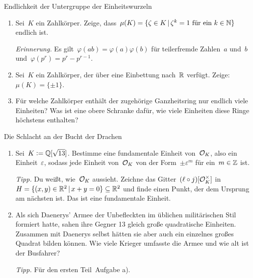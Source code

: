 \documentclass{uebblatt}
\begin{document}

\begin{aufgabe}{Endlichkeit der Untergruppe der Einheitswurzeln}
\begin{enumerate}
\item Sei~$K$ ein Zahlkörper. Zeige, dass~$\mu(K) = \{ \zeta \in K \,|\,
\text{$\zeta^k = 1$ für ein~$k \in \mathbb{N}$} \}$ endlich ist.

{\tiny\emph{Erinnerung.} Es gilt~$\varphi(ab) = \varphi(a) \varphi(b)$ für
teilerfremde Zahlen~$a$ und~$b$ und~$\varphi(p^r) = p^r - p^{r-1}$.\par}

\item Sei~$K$ ein Zahlkörper, der über eine Einbettung nach~$\mathbb{R}$ verfügt.
Zeige: $\mu(K) = \{ \pm1 \}$.

\item Für welche Zahlkörper enthält der zugehörige Ganzheitsring nur endlich
viele Einheiten? Was ist eine obere Schranke dafür, wie viele Einheiten diese
Ringe höchstens enthalten?
\end{enumerate}
\end{aufgabe}

\begin{aufgabe}{Die Schlacht an der Bucht der Drachen}
\begin{enumerate}
\item Sei~$K \vcentcolon= \mathbb{Q}[\sqrt{13}]$. Bestimme eine fundamentale Einheit
von~$\mathcal{O}_K$, also ein Einheit~$\varepsilon$, sodass jede Einheit von~$\mathcal{O}_K$ von der
Form~$\pm \varepsilon^m$ für ein~$m \in \mathbb{Z}$ ist.

{\tiny\emph{Tipp.} Du weißt, wie~$\mathcal{O}_K$ aussieht. Zeichne das
Gitter~$(\ell \circ j)[\mathcal{O}_K^\times]$ in~$H = \{ (x,y) \in \mathbb{R}^2 \,|\, x + y = 0
\} \subseteq \mathbb{R}^2$ und
finde einen Punkt, der dem Ursprung am nächsten ist. Das ist eine fundamentale
Einheit.\par}

\item Als sich Daenerys' Armee der Unbefleckten im üblichen militärischen Stil
formiert hatte, sahen ihre Gegner 13 gleich große quadratische Einheiten.
Zusammen mit Daenerys selbst hätten sie aber auch ein einzelnes großes Quadrat
bilden können. Wie viele Krieger umfasste die Armee und wie alt ist der
Busfahrer?

{\tiny\emph{Tipp.} Für den ersten Teil~Aufgabe a).\par}
\end{enumerate}
\end{aufgabe}
\end{document}
